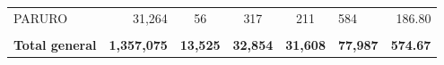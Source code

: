 \begin{tabular}{lrccclr}
	\cellcolor[HTML]{C6E0B4}PARURO                                 & 31,264                                                         & 56                                                          & 317                  & 211                      & 584                                                                 & 186.80                                                                       \\
	& \multicolumn{1}{l}{}                                           & \multicolumn{1}{l}{}                                        & \multicolumn{1}{l}{} & \multicolumn{1}{l}{}     &                                                                     & \multicolumn{1}{l}{}                                                         \\
	\rowcolor[HTML]{DDEBF7} 
	\textbf{Total   general}                                       & \textbf{1,357,075}                                             & \multicolumn{1}{r}{\cellcolor[HTML]{DDEBF7}\textbf{13,525}} & \textbf{32,854}      & \textbf{31,608}          & \textbf{77,987}                                                     & \textbf{574.67}                                                             
\end{tabular}